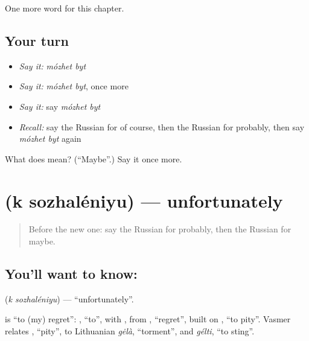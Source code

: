 \begin{grammarlens}[title={What you've built}]
One more word for this chapter.
\end{grammarlens}

\subsection*{Your turn}
\begin{itemize}
\raggedright
  \item \emph{Say it:} \emph{mózhet byt}
  \item \emph{Say it:} \emph{mózhet byt}, once more
  \item \emph{Say it:} say \emph{mózhet byt}
  \item \emph{Recall:} say the Russian for of course, then the Russian for probably, then say \emph{mózhet byt} again
\end{itemize}

\begin{tcolorbox}[breakable,colback=teal!4,colframe=teal!35!black,title={Before you move on}]
What does   mean? (\textquotedblleft{}Maybe\textquotedblright{}.) Say it once more.
\end{tcolorbox}
\section[\texorpdfstring{\ru{к} \ru{сожалению} (k sozhaléniyu)}{к сожалению (k sozhaléniyu)}]{  (k sozhaléniyu) — unfortunately}

\label{lesson:RU-C215-k-sozhaleniyu}



\begin{quote}
Before the new one: say the Russian for probably, then the Russian for maybe.
\end{quote}

\subsection*{You'll want to know:  }
\textbf{ } (\emph{k sozhaléniyu}) — \textquotedblleft{}unfortunately\textquotedblright{}.

\begin{cousinweb}
\textbf{ } is \textquotedblleft{}to (my) regret\textquotedblright{}: \emph{}, \textquotedblleft{}to\textquotedblright{}, with \emph{}, from \emph{}, \textquotedblleft{}regret\textquotedblright{}, built on \emph{}, \textquotedblleft{}to pity\textquotedblright{}. Vasmer relates \emph{}, \textquotedblleft{}pity\textquotedblright{}, to Lithuanian \emph{gėlà}, \textquotedblleft{}torment\textquotedblright{}, and \emph{gélti}, \textquotedblleft{}to sting\textquotedblright{}.
\end{cousinweb}

